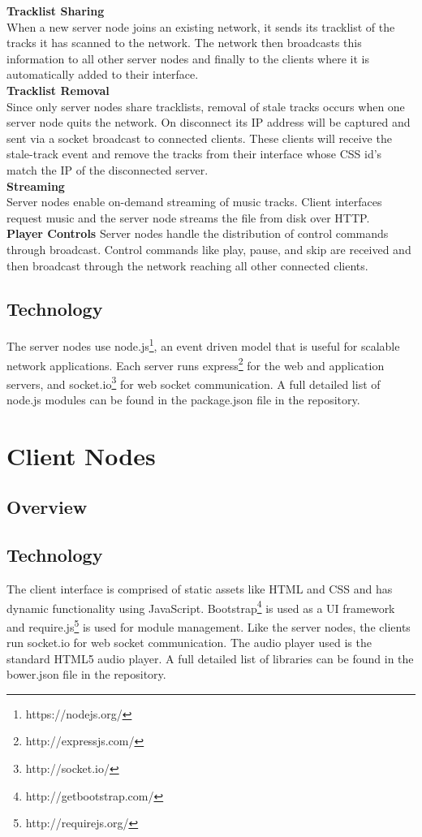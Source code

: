 \documentclass[12pt]{article}
\begin{document}
\textbf{Tracklist Sharing}\\
When a new server node joins an existing network, it sends its tracklist of the tracks it has scanned to the network. The network then broadcasts this information to all other server nodes and finally to the clients where it is automatically added to their interface.\\

\textbf{Tracklist Removal}\\
Since only server nodes share tracklists, removal of stale tracks occurs when one server node quits the network. On disconnect its IP address will be captured and sent via a socket broadcast to connected clients. These clients will receive the stale-track event and remove the tracks from their interface whose CSS id’s match the IP of the disconnected server.\\

\textbf{Streaming}\\
Server nodes enable on-demand streaming of music tracks. Client interfaces request music and the server node streams the file from disk over HTTP.\\

\textbf{Player Controls}
Server nodes handle the distribution of control commands through broadcast. Control commands like play, pause, and skip are received and then broadcast through the network reaching all other connected clients.

\subsection{Technology}
The server nodes use node.js\footnote{https://nodejs.org/}, an event driven model that is useful for scalable network applications. Each server runs express\footnote{http://expressjs.com/} for the web and application servers, and socket.io\footnote{http://socket.io/} for web socket communication. A full detailed list of node.js modules can be found in the package.json file in the repository.

\section{Client Nodes}

\subsection{Overview}

\subsection{Technology}
The client interface is comprised of static assets like HTML and CSS and has dynamic functionality using JavaScript. Bootstrap\footnote{http://getbootstrap.com/} is used as a UI framework and require.js\footnote{http://requirejs.org/} is used for module management. Like the server nodes, the clients run socket.io for web socket communication. The audio player used is the standard HTML5 audio player. A full detailed list of libraries can be found in the bower.json file in the repository.
\end{document}
